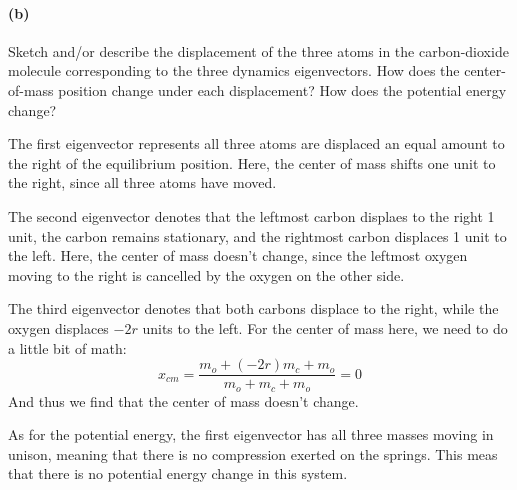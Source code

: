 \documentclass{article}
\begin{document}
\paragraph{(b)}
Sketch and/or describe the displacement of the three atoms in the carbon-dioxide molecule corresponding to the three dynamics eigenvectors.   How does the 
center-of-mass position change under each displacement?  How does the potential energy change?

\begin{solution}
	The first eigenvector represents all three atoms are 
	displaced an equal amount to the right of the equilibrium position. Here, the center of mass shifts one 
	unit to the right, since all three atoms have moved.

	The second eigenvector denotes that the leftmost carbon displaes to the right 1 unit, the carbon remains 
	stationary, and the rightmost carbon displaces 1 unit to the left. Here, the center of mass doesn't change, 
	since the leftmost oxygen moving to the right is cancelled by the oxygen on the other side. 

	The third eigenvector denotes that both carbons displace to the right, while the oxygen displaces $-2r$ 
	units to the left. For the center of mass here, we need to do a little bit of math:
	\[
		x_{cm} = \frac{m_o + (-2r)m_c + m_o}{m_o + m_c + m_o} = 0
	\] 
	And thus we find that the center of mass doesn't change. 

	As for the potential energy, the first eigenvector has all three masses moving in unison, meaning 
	that there is no compression exerted on the springs. This meas that there is no potential energy change 
	in this system.


\end{solution}
\end{document}

